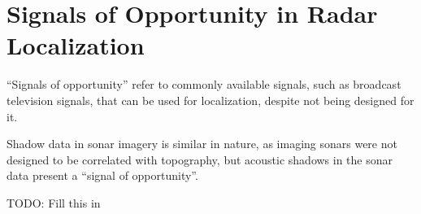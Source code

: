 \section{Signals of Opportunity in Radar Localization}
\label{related.Signals}

``Signals of opportunity'' refer to commonly available signals, such as broadcast television signals, that can be used for localization, despite not being designed for it.

Shadow data in sonar imagery is similar in nature, as imaging sonars were not designed to be correlated with topography, but acoustic shadows in the sonar data present a ``signal of opportunity''.

TODO: Fill this in


